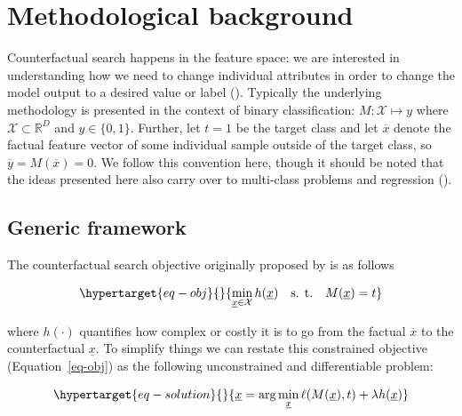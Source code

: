 \documentclass[
  letterpaper,
  DIV=11,
  numbers=noendperiod]{scrartcl}
\begin{document}
\hypertarget{sec-method}{%
\section{Methodological background}\label{sec-method}}

Counterfactual search happens in the feature space: we are interested in
understanding how we need to change individual attributes in order to
change the model output to a desired value or label
(\cite{molnar2020interpretable}). Typically the underlying methodology
is presented in the context of binary classification:
\(M: \mathcal{X} \mapsto y\) where \(\mathcal{X}\subset\mathbb{R}^D\)
and \(y\in\{0,1\}\). Further, let \(t=1\) be the target class and let
\(\overline{x}\) denote the factual feature vector of some individual
sample outside of the target class, so
\(\overline{y}=M(\overline{x})=0\). We follow this convention here,
though it should be noted that the ideas presented here also carry over
to multi-class problems and regression (\cite{molnar2020interpretable}).

\hypertarget{generic-framework}{%
\subsection{Generic framework}\label{generic-framework}}

The counterfactual search objective originally proposed by
\cite{wachter2017counterfactual} is as follows

\begin{equation}\protect\hypertarget{eq-obj}{}{
\min_{\underline{x} \in \mathcal{X}} h(\underline{x}) \ \ \ \mbox{s. t.} \ \ \ M(\underline{x}) = t
}\label{eq-obj}\end{equation}

where \(h(\cdot)\) quantifies how complex or costly it is to go from the
factual \(\overline{x}\) to the counterfactual \(\underline{x}\). To
simplify things we can restate this constrained objective
(Equation~\ref{eq-obj}) as the following unconstrained and
differentiable problem:

\begin{equation}\protect\hypertarget{eq-solution}{}{
\underline{x} = \arg \min_{\underline{x}}  \ell(M(\underline{x}),t) + \lambda h(\underline{x})
}\label{eq-solution}\end{equation}
\end{document}
